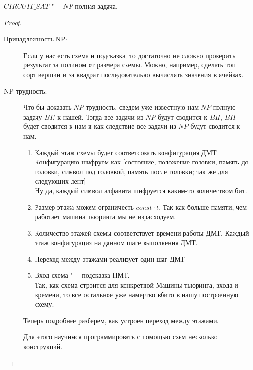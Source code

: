 \begin{theorem}
	$CIRCUIT\_SAT$ "--- $NP$-полная задача. 
\end{theorem}
\begin{proof}
	\begin{description}
	\item[Принадлежность NP:]
		Если у нас есть схема и подсказка, то достаточно не сложно проверить результат за полином от размера схемы. 
		Можно, например, сделать топ сорт вершин и за квадрат последовательно вычислять значения в ячейках.
	\item[NP-трудность:]
		Что бы доказать $NP$-трудность, сведем уже известную нам $NP$-полную задачу $BH$ к нашей. 
		Тогда все задачи из $NP$ будут сводится к $BH$, $BH$ будет сводится к нам и как следствие все задачи из $NP$ 
		будут сводится к нам. 

		\begin{enumerate}
		\item 
			Каждый этаж схемы будет соответсовать конфигурация ДМТ.\\
			Конфигурацию шифруем как [состояние, положение головки, память до головки, символ под головкой, память после головки; так же для следующих лент]\\
		
		        Ну да, каждый символ алфавита шифруется каким-то количеством бит. 

		\item	Размер этажа можем ограничесть $const \cdot t$. Так как больше памяти, чем работает машина тьюринга мы не израсходуем.\\ 
		
		\item 
			Количество этажей схемы соответствует времени работы ДМТ. Каждый этаж конфигурация 
			на данном шаге выполнения ДМТ.
		\item 
			Переход между этажами реализует один шаг ДМТ\\
		\item 
			Вход схема "--- подсказка НМТ. \\
			Так, как схема строится для конкретной Машины тьюринга, входа и времени, то все остальное
			уже намертво вбито в нашу построенную схему.  

		\end{enumerate}

		Теперь подробнее разберем, как устроен переход между этажами. 

		Для этого научимся программировать с помощью схем несколько конструкций. 
		

\end{description}
\end{proof}
